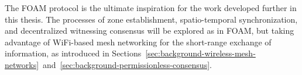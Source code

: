 The FOAM protocol is the ultimate inspiration for the work developed further in this thesis. The processes of zone establishment, spatio-temporal synchronization, and decentralized witnessing consensus will be explored as in FOAM, but taking advantage of WiFi-based mesh networking for the short-range exchange of information, as introduced in Sections~\ref{sec:background-wireless-mesh-networks}~and~\ref{sec:background-permissionless-consensus}.